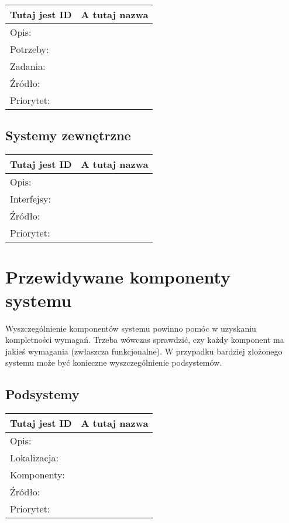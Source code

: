 \documentclass[a4paper,10pt]{article}
\begin{document}
\begin{center}
\begin{tabular}{|l|l|} \hline

Tutaj jest ID & A tutaj nazwa \\ \hline
Opis: &  \\ \hline
Potrzeby: &  \\ \hline
Zadania: &  \\ \hline
Źródło: &  \\ \hline
Priorytet: &  \\ \hline

\end{tabular}
\end{center}

\subsection{Systemy zewnętrzne}

\begin{center}
\begin{tabular}{|l|l|} \hline

Tutaj jest ID & A tutaj nazwa \\ \hline
Opis: &  \\ \hline
Interfejsy: &  \\ \hline
Źródło: &  \\ \hline
Priorytet: &  \\ \hline

\end{tabular}
\end{center}

\section{Przewidywane komponenty systemu}

Wyszczególnienie komponentów systemu powinno pomóc w uzyskaniu kompletności wymagań. Trzeba wówczas sprawdzić, czy każdy komponent ma jakieś wymagania (zwłaszcza funkcjonalne). W przypadku bardziej złożonego systemu może być konieczne wyszczególnienie podsystemów.

\subsection{Podsystemy}

\begin{center}
\begin{tabular}{|l|l|} \hline

Tutaj jest ID & A tutaj nazwa \\ \hline
Opis: &  \\ \hline
Lokalizacja: &  \\ \hline
Komponenty: & \\ \hline
Źródło: &  \\ \hline
Priorytet: &  \\ \hline

\end{tabular}
\end{center}
\end{document}

